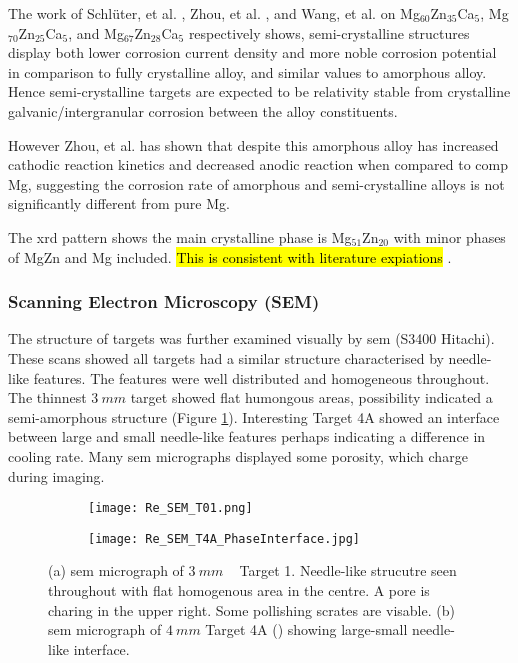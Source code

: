 \documentclass[a4paper,12pt,oneside]{report}%
\begin{document}
The work of Schl{\"u}ter, et al. \cite{Schluter2012}, Zhou, et al. \cite{Zhou2013}, and Wang, et al. \cite{Wang2012} on Mg$_{60}$Zn$_{35}$Ca$_{5}$, Mg$_{70}$Zn$_{25}$Ca$_{5}$, and Mg$_{67}$Zn$_{28}$Ca$_{5}$ respectively shows, semi-crystalline structures display both lower corrosion current density and more noble corrosion potential in comparison to fully crystalline alloy, and similar values to amorphous alloy. Hence semi-crystalline targets are expected to be relativity stable from crystalline galvanic/intergranular corrosion between the alloy constituents. 

However Zhou, et al. \cite{Zhou2013} has shown that despite this amorphous alloy has increased cathodic reaction kinetics and decreased anodic reaction when compared to \acrshort{comp} Mg, suggesting the corrosion rate of amorphous and semi-crystalline alloys is not significantly different from pure Mg.



The \gls{xrd} pattern shows the main crystalline phase is  Mg$_{51}$Zn$_{20}$ with minor phases of MgZn and Mg included. \hl{This is consistent with literature expiations} \cite{Laws2016, Khan1989}.


\subsubsection{Scanning Electron Microscopy (SEM)}
The structure of targets was further examined visually by \gls{sem} (S3400 Hitachi). These scans showed all targets had a similar structure characterised by needle-like features. The features were well distributed and homogeneous throughout. The thinnest $3~ mm$ target showed flat humongous areas, possibility indicated a semi-amorphous structure (Figure \ref{fig:SEMT01}). Interesting Target 4A showed an interface between large and small needle-like features perhaps indicating a difference in cooling rate. Many \gls{sem} micrographs displayed some porosity, which charge during imaging. 

\begin{figure}[htbp]
	\centering
	\begin{subfigure}[htbp]{0.51\textwidth}
		\texttt{[image: Re\_SEM\_T01.png]}
		\caption{}
		\label{fig:SEMT01}
	\end{subfigure}
	\begin{subfigure}[htbp]{0.47\textwidth}
		\texttt{[image: Re\_SEM\_T4A\_PhaseInterface.jpg]}
		\caption{}
		\label{fig:SEMT04A}
	\end{subfigure}
	\caption{(a) \acrshort{sem} micrograph of $3~ mm$ \MgZnCa~ Target 1. Needle-like strucutre seen throughout with flat homogenous area in the centre. A pore is charing in the upper right. Some pollishing scrates are visable. (b) \acrshort{sem} micrograph of  $4~ mm$ Target 4A (\MgZnCa) showing large-small needle-like interface.}%
	\label{fig:SEMT0104A}
\end{figure}
\end{document}
